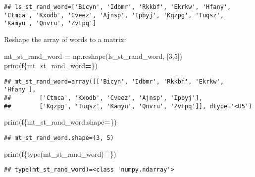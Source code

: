 \documentclass[
]{book}
\newenvironment{Shaded}{\begin{snugshade}}{\end{snugshade}}
\newcommand{\BuiltInTok}[1]{#1}
\newcommand{\DecValTok}[1]{\textcolor[rgb]{0.00,0.00,0.81}{#1}}
\newcommand{\NormalTok}[1]{#1}
\newcommand{\OperatorTok}[1]{\textcolor[rgb]{0.81,0.36,0.00}{\textbf{#1}}}
\newcommand{\SpecialCharTok}[1]{\textcolor[rgb]{0.00,0.00,0.00}{#1}}
\newcommand{\SpecialStringTok}[1]{\textcolor[rgb]{0.31,0.60,0.02}{#1}}
\begin{document}
\begin{verbatim}
## ls_st_rand_word=['Bicyn', 'Idbmr', 'Rkkbf', 'Ekrkw', 'Hfany', 'Ctmca', 'Kxodb', 'Cveez', 'Ajnsp', 'Ipbyj', 'Kqzpg', 'Tuqsz', 'Kamyu', 'Qnvru', 'Zvtpq']
\end{verbatim}

Reshape the array of words to a matrix:

\begin{Shaded}
\begin{Highlighting}[]
\NormalTok{mt\_st\_rand\_word }\OperatorTok{=}\NormalTok{ np.reshape(ls\_st\_rand\_word, [}\DecValTok{3}\NormalTok{,}\DecValTok{5}\NormalTok{])}
\BuiltInTok{print}\NormalTok{(}\SpecialStringTok{f\textquotesingle{}}\SpecialCharTok{\{}\NormalTok{mt\_st\_rand\_word}\OperatorTok{=}\SpecialCharTok{\}}\SpecialStringTok{\textquotesingle{}}\NormalTok{)}
\end{Highlighting}
\end{Shaded}

\begin{verbatim}
## mt_st_rand_word=array([['Bicyn', 'Idbmr', 'Rkkbf', 'Ekrkw', 'Hfany'],
##        ['Ctmca', 'Kxodb', 'Cveez', 'Ajnsp', 'Ipbyj'],
##        ['Kqzpg', 'Tuqsz', 'Kamyu', 'Qnvru', 'Zvtpq']], dtype='<U5')
\end{verbatim}

\begin{Shaded}
\begin{Highlighting}[]
\BuiltInTok{print}\NormalTok{(}\SpecialStringTok{f\textquotesingle{}}\SpecialCharTok{\{}\NormalTok{mt\_st\_rand\_word}\SpecialCharTok{.}\NormalTok{shape}\OperatorTok{=}\SpecialCharTok{\}}\SpecialStringTok{\textquotesingle{}}\NormalTok{)}
\end{Highlighting}
\end{Shaded}

\begin{verbatim}
## mt_st_rand_word.shape=(3, 5)
\end{verbatim}

\begin{Shaded}
\begin{Highlighting}[]
\BuiltInTok{print}\NormalTok{(}\SpecialStringTok{f\textquotesingle{}}\SpecialCharTok{\{}\BuiltInTok{type}\NormalTok{(mt\_st\_rand\_word)}\OperatorTok{=}\SpecialCharTok{\}}\SpecialStringTok{\textquotesingle{}}\NormalTok{)}
\end{Highlighting}
\end{Shaded}

\begin{verbatim}
## type(mt_st_rand_word)=<class 'numpy.ndarray'>
\end{verbatim}
\end{document}
